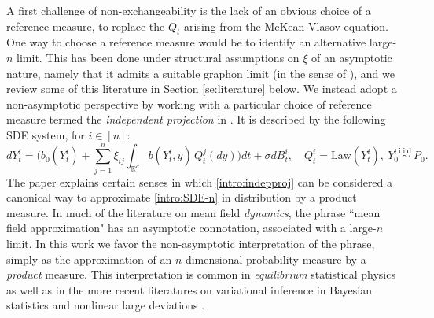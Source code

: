 \documentclass[11pt,reqno]{amsart}
\numberwithin{equation}{section}
\theoremstyle{definition}
\def\R{{\mathbb R}}
\begin{document}
A first challenge of non-exchangeability  is the lack of an obvious choice of a reference measure, to replace the $Q_t$ arising from the McKean-Vlasov equation. One way to choose a reference measure would be to identify an alternative large-$n$ limit. This has been done under  structural assumptions on $\xi$ of an asymptotic nature, namely that it admits a suitable graphon limit (in the sense of \cite{lovasz2012large}), and we review some of this literature in Section \ref{se:literature} below.
We instead adopt a non-asymptotic perspective by working with a particular choice of reference measure termed the \emph{independent projection} in \cite{lacker2023independent}. It is described by the following SDE system, for $i \in [n]$:
\begin{equation}
dY^i_t = \bigg(b_0(Y^i_t) + \sum_{j=1}^n\xi_{ij}\int_{\R^d} b(Y^i_t,y)\,Q^j_t(dy)\bigg)dt + \sigma dB^i_t, \quad Q^i_t=\mathrm{Law}(Y^i_t), \ Y^i_0  \stackrel{\text{i.i.d.}}{\sim} P_0. \label{intro:indepproj}
\end{equation}
The paper \cite{lacker2023independent}  explains certain senses in which \eqref{intro:indepproj} can be considered a canonical way to approximate \eqref{intro:SDE-n} in distribution by a product measure.
In much of the literature on mean field \emph{dynamics}, the phrase ``mean field approximation" has an asymptotic connotation, associated with a  large-$n$ limit.
In this work we favor the non-asymptotic interpretation of the phrase, simply as the approximation of an $n$-dimensional probability measure by a \emph{product} measure. This interpretation is common in \emph{equilibrium} statistical physics as well as in the more recent literatures on variational inference in Bayesian statistics \cite{blei2017variational} and nonlinear large deviations \cite{chatterjee2016nonlinear}.
\end{document}
